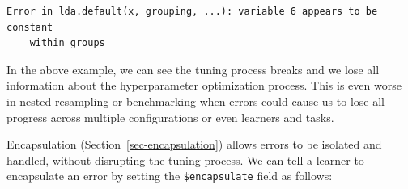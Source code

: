 \begin{Shaded}
\begin{Highlighting}[]
\OtherTok{=} \NormalTok{(}\NormalTok{)}
\SpecialCharTok{$}\SpecialCharTok{$}\NormalTok{row\_ids[}\SpecialCharTok{$}\NormalTok{())])}
\OtherTok{=} \NormalTok{(}\NormalTok{)}
\SpecialCharTok{$}
  \SpecialCharTok{$}\NormalTok{row\_ids[tsk\_pen}\SpecialCharTok{$}\NormalTok{()}\SpecialCharTok{$}\SpecialCharTok{!=} \NormalTok{]),}
  \SpecialCharTok{$}\NormalTok{row\_ids[tsk\_pen}\SpecialCharTok{$}\NormalTok{()}\SpecialCharTok{$}\SpecialCharTok{==} \NormalTok{])}
\NormalTok{)}
\OtherTok{=} \NormalTok{(}\NormalTok{)}
\OtherTok{=} \NormalTok{(}\NormalTok{)}
\OtherTok{=} \NormalTok{(}\NormalTok{, } \NormalTok{, } \NormalTok{(}\NormalTok{, }\NormalTok{))}

\NormalTok{)}
\end{Highlighting}
\end{Shaded}

\begin{verbatim}
Error in lda.default(x, grouping, ...): variable 6 appears to be constant
	within groups
\end{verbatim}

In the above example, we can see the tuning process breaks and we lose
all information about the hyperparameter optimization process. This is
even worse in nested resampling or benchmarking when errors could cause
us to lose all progress across multiple configurations or even learners
and tasks.

Encapsulation (Section~\ref{sec-encapsulation})
allows errors to be isolated and handled, without disrupting the tuning
process. We can tell a learner to encapsulate an error by setting the
\texttt{\$encapsulate} field as follows:

